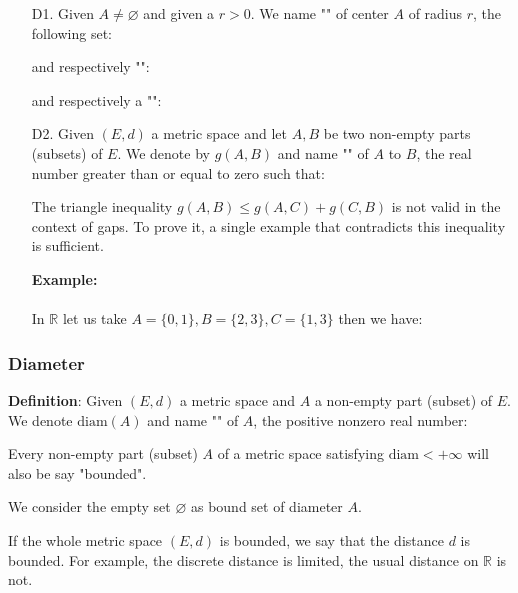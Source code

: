 	\begin{enumerate}
		\item[D1.] Given $A\neq \varnothing$ and given a $r>0$. We name "" of center $A$ of radius $r$, the following set:
		
		and respectively "":
		
		and respectively  a "":
		
		
		\item[D2.] Given $(E, d)$ a metric space and let $A, B$ be two non-empty parts (subsets) of $E$. We denote by $g (A, B)$ and name "" of $A$ to $B$, the real number greater than or equal to zero such that:
		
		\begin{tcolorbox}[title=Remark,colframe=black,arc=10pt]
		The triangle inequality $g(A,B)\leq g(A,C)+g(C,B)$ is not valid in the context of gaps. To prove it, a single example that contradicts this inequality is sufficient.
		\end{tcolorbox}
		\begin{tcolorbox}[colframe=black,colback=white,sharp corners]
		\textbf{{\Large {}}Example:}\\\\
		In $\mathbb{R}$ let us take $A=\{0,1\},B=\{2,3\},C=\{1,3\}$ then we have:
		
		\end{tcolorbox}	
	\end{enumerate}
	
	\subsubsection{Diameter}
	\textbf{Definition}: Given $(E, d)$ a metric space and $A$ a non-empty part (subset) of $E$. We denote $\text{diam}(A)$ and name "" of $A$, the positive nonzero real number:
	
	Every non-empty part (subset) $A$ of a metric space satisfying $\text{diam}<+\infty$ will also be say "bounded".
	\begin{tcolorbox}[title=Remark,colframe=black,arc=10pt]
	We consider the empty set $\varnothing$ as bound set of diameter $A$.
	\end{tcolorbox}	
	If the whole metric space $(E,d)$ is bounded, we say that the distance $d$ is bounded. For example, the discrete distance is limited, the usual distance on $\mathbb{R}$ is not.
	
